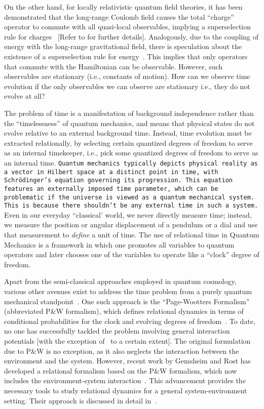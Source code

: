 On the other hand, for locally relativistic quantum field theories, it has been demonstrated
that the long-range Coulomb field causes the total ``charge'' operator to commute
with all quasi-local observables, implying a superselection rule for charges~\cite{Strocchi:1974xh} 
[Refer to  for further details].
Analogously, due to the coupling of energy with the long-range gravitational field, 
there is speculation about the existence of a superselection rule for energy~\cite{page1983evolution}.
This implies that only operators that commute
with the Hamiltonian can be observable. However, such observables are stationary
(i.e., constants of motion). How can we observe time evolution if the only observables
we can observe are stationary i.e., they do not evolve at all?

The problem of time is a manifestation of background independence rather than the
``timelessness'' of quantum mechanics, and means that physical states do not evolve
relative to an external background time. Instead, time evolution must be extracted relationally, 
by selecting certain quantized degrees of freedom to serve as an internal timekeeper, 
i.e., pick some quantized degrees of freedom to serve as an internal time. 
\texttt{Quantum mechanics typically depicts physical reality as a vector in Hilbert space at a distinct point in time, with Schrödinger's equation governing its progression. This equation features an externally imposed time parameter, which can be problematic if the universe is viewed as a quantum mechanical system. This is because there shouldn't be any external time in such a system.}
Even in our everyday ``classical' world, we never directly measure time; instead, we measure the
position or angular displacement of a pendulum or a dial and use that measurement to \emph{define} a
unit of time. The use of relational time in Quantum
Mechanics is a framework in which one promotes all variables to quantum operators and
later chooses one of the variables to operate like a ``clock'' degree of freedom.

Apart from the semi-classical approaches employed in quantum cosmology, various other 
avenues exist to address the time problem from a purely quantum mechanical standpoint~\cite{hohn2021trinity}. 
One such approach is the ``Page-Wootters Formalism'' (abbreviated P\&W formalism), 
which defines relational dynamics in terms of conditional probabilities for the clock and 
evolving degrees of freedom~\cite{page1983evolution}. To date, no one has successfully tackled 
the problem involving general interaction potentials [with the exception of~\cite{Smith:2017pwx} 
to a certain extent]. The original formulation due to P\&W is no exception, as it also neglects 
the interaction between the environment and the system. However, recent work by Gemsheim and Rost 
has developed a relational formalism based on the P\&W formalism, which now includes the 
environment-system interaction~\cite{Gemsheim:2023izg}. This advancement provides the necessary 
tools to study relational dynamics for a general system-environment setting. Their approach is 
discussed in detail in~.



